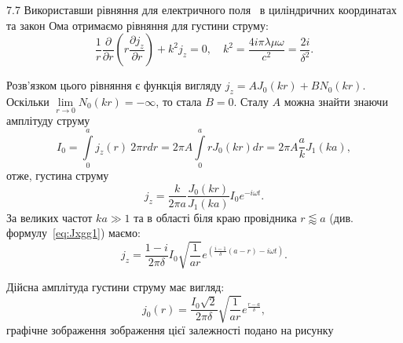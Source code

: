 \begin{Solution}{7.{7}}
    Використавши  рівняння для електричного поля~\label{eq:skin-effect} в циліндричних координатах та закон Ома отримаємо рівняння для густини струму:
\[
		\frac{1}{r}\frac{\partial }{{\partial r}}\left( {r\frac{{\partial {j_z}}}{{\partial r}}} \right) + {k^2}{j_z} = 0, \quad k^2 = \frac{4i\pi\lambda\mu\omega}{c^2} = \frac{2i}{\delta^2}.
\]

Розв'язком цього рівняння є функція вигляду $j_z = AJ_0(kr) + BN_0(kr)$. Оскільки $\lim\limits_{r\to0}N_0(kr) = -\infty$, то стала $B = 0$. Сталу $A$ можна знайти знаючи амплітуду струму
\[
   I_0 = \int\limits_0^a j_z(r)\ 2\pi rdr = 2\pi A \int\limits_0^a r J_0(kr) dr = 2\pi A \frac{a}{k} J_1(ka),
\]
отже, густина струму
\[
	j_z = \frac{k}{2\pi a} \frac{J_0(kr)}{J_1(ka)} I_0e^{-i\omega t}.
\]
За великих частот $ka \gg 1$ та в області біля краю провідника $ r \lessapprox a$ (див. формулу~\eqref{eq:Jxgg1}) маємо:
\[
    j_z = \frac{1-i}{2\pi\delta} I_0 \sqrt{\frac1{ar}} e^{\left( \frac{i - 1}{\delta} (a-r) - i\omega t\right) }.
\]

Дійсна амплітуда густини струму має вигляд:
\[
    j_0(r) = \frac{I_0\sqrt{2}}{2\pi\delta}  \sqrt{\frac1{ar}}e^{\frac{r-a}{\delta}},
\]
графічне зображення зображення цієї залежності подано на рисунку

\begin{center}
\end{center}
\end{Solution}
